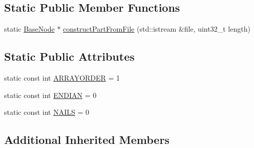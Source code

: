 \subsection*{Static Public Member Functions}
\begin{DoxyCompactItemize}
\item 
static \hyperlink{class_base_node}{Base\-Node} $\ast$ \hyperlink{class_int_leaf_aeedcffeab76e98891ed98a235696c3db}{construct\-Part\-From\-File} (std\-::istream \&file, uint32\-\_\-t length)
\end{DoxyCompactItemize}
\subsection*{Static Public Attributes}
\begin{DoxyCompactItemize}
\item 
static const int \hyperlink{class_int_leaf_af01a2d863b6f746f3f0b2ca7fa283561}{A\-R\-R\-A\-Y\-O\-R\-D\-E\-R} = 1
\item 
static const int \hyperlink{class_int_leaf_a3114b538c3c64d8013ab7823377703ce}{E\-N\-D\-I\-A\-N} = 0
\item 
static const int \hyperlink{class_int_leaf_a4827cc727b294e977a03881ff3b852d6}{N\-A\-I\-L\-S} = 0
\end{DoxyCompactItemize}
\subsection*{Additional Inherited Members}



